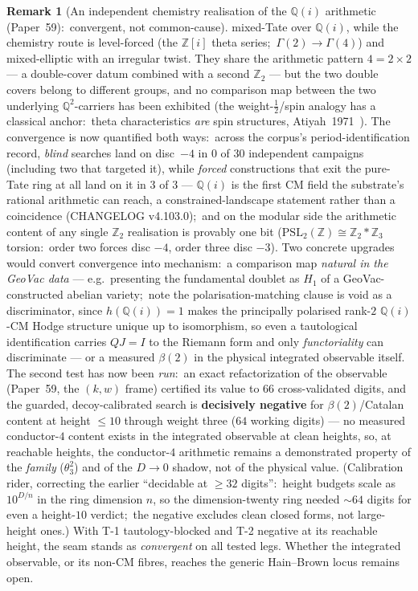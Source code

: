\documentclass[11pt,a4paper]{article}
\theoremstyle{plain}
\theoremstyle{definition}
\newtheorem{remark}[theorem]{Remark}
\newcommand{\Q}{\mathbb{Q}}
\newcommand{\Z}{\mathbb{Z}}
\begin{document}
\begin{remark}[An independent chemistry realisation of the $\Q(i)$ arithmetic
(Paper~59):\ convergent, not common-cause]
mixed-Tate over $\Q(i)$, while the chemistry route is level-forced (the
$\Z[i]$ theta series;\ $\Gamma(2)\to\Gamma(4)$) and mixed-elliptic with an
irregular twist.  They share the arithmetic pattern $4=2\times2$ --- a
double-cover datum combined with a second $\Z_2$ --- but the two double covers
belong to different groups, and no comparison map between the two underlying
$\Q^2$-carriers has been exhibited (the weight-$\tfrac12$/spin analogy has a
classical anchor:\ theta characteristics \emph{are} spin structures,
Atiyah~1971~\cite{atiyah1971}).  The convergence is now quantified both ways:\
across the corpus's period-identification record, \emph{blind} searches land on
disc~$-4$ in $0$ of $30$ independent campaigns (including two that targeted it),
while \emph{forced} constructions that exit the pure-Tate ring at all land on it
in $3$ of $3$ --- $\Q(i)$ is the first CM field the substrate's rational
arithmetic can reach, a constrained-landscape statement rather than a
coincidence (CHANGELOG v4.103.0);\ and on the modular side the arithmetic
content of any single $\Z_2$ realisation is provably one bit
($\mathrm{PSL}_2(\Z)\cong\Z_2\ast\Z_3$ torsion:\ order two forces disc $-4$,
order three disc $-3$).  Two concrete upgrades would convert convergence
into mechanism:\ a comparison map \emph{natural in the GeoVac data} --- e.g.\
presenting the fundamental doublet as $H_1$ of a GeoVac-constructed abelian
variety;\ note the polarisation-matching clause is void as a discriminator,
since $h(\Q(i))=1$ makes the principally polarised rank-$2$ $\Q(i)$-CM Hodge
structure unique up to isomorphism, so even a tautological identification
carries $QJ=I$ to the Riemann form and only \emph{functoriality} can
discriminate --- or a measured $\beta(2)$ in the physical integrated observable
itself.  The second test has now been \emph{run}:\ an exact refactorization of
the observable (Paper~59, the $(k,w)$ frame) certified its value to $66$
cross-validated digits, and the guarded, decoy-calibrated search is
\textbf{decisively negative} for $\beta(2)$/Catalan content at height $\le10$
through weight three ($64$ working digits) --- no measured conductor-$4$
content exists in the integrated observable at clean heights, so, at reachable
heights, the conductor-$4$ arithmetic remains a demonstrated property of the
\emph{family} ($\theta_3^2$) and of the $D\to0$ shadow, not of the physical
value.  (Calibration rider,
correcting the earlier ``decidable at $\ge32$ digits'':\ height budgets scale
as $10^{D/n}$ in the ring dimension $n$, so the dimension-twenty ring needed
$\sim\!64$ digits for even a height-$10$ verdict;\ the negative excludes clean
closed forms, not large-height ones.)  With T-1 tautology-blocked and T-2
negative at its reachable height, the seam stands as \emph{convergent} on all
tested legs.  Whether the integrated observable, or its non-CM fibres, reaches
the generic Hain--Brown locus remains open.
\end{remark}
\end{document}

